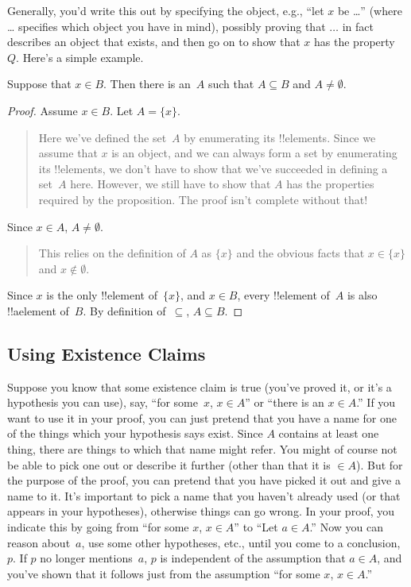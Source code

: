 \documentclass[../../../include/open-logic-section]{subfiles}
\begin{document}
Generally, you'd write this out by specifying the object, e.g., ``let
$x$ be \dots'' (where \dots{} specifies which object you have in
mind), possibly proving that $\dots$ in fact describes an object that
exists, and then go on to show that $x$ has the property~$Q$. Here's a
simple example.

\begin{prop}
  Suppose that $x \in B$. Then there is an~$A$ such that $A \subseteq
  B$ and $A \neq \emptyset$.
\end{prop}

\begin{proof}
  Assume $x \in B$. Let $A = \{x\}$.
  \begin{quote}
    Here we've defined the set~$A$ by enumerating its
    !!{element}s. Since we assume that $x$ is an object, and we can
    always form a set by enumerating its !!{element}s, we don't have
    to show that we've succeeded in defining a set~$A$ here.  However,
    we still have to show that $A$ has the properties required by the
    proposition. The proof isn't complete without that!{}
  \end{quote}
  Since $x \in A$, $A \neq \emptyset$.
  \begin{quote}
    This relies on the definition of $A$ as $\{x\}$ and the obvious
    facts that $x \in \{x\}$ and $x \notin \emptyset$.
  \end{quote}
  Since $x$ is the only !!{element} of~$\{x\}$, and $x \in B$, every
  !!{element} of~$A$ is also !!a{element} of~$B$. By definition
  of~$\subseteq$, $A \subseteq B$.
\end{proof}

\subsection{Using Existence Claims}

Suppose you know that some existence claim is true (you've proved it,
or it's a hypothesis you can use), say, ``for some~$x$, $x \in A$'' or
``there is an $x \in A$.''  If you want to use it in your proof, you
can just pretend that you have a name for one of the things which your
hypothesis says exist. Since $A$ contains at least one thing, there
are things to which that name might refer. You might of course not be
able to pick one out or describe it further (other than that it is
$\in A$). But for the purpose of the proof, you can pretend that you
have picked it out and give a name to it. It's important to pick a
name that you haven't already used (or that appears in your
hypotheses), otherwise things can go wrong. In your proof, you
indicate this by going from ``for some $x$, $x \in A$'' to ``Let $a
\in A$.''  Now you can reason about~$a$, use some other hypotheses, etc.,
until you come to a conclusion, $p$. If $p$ no longer mentions~$a$, $p$ is
independent of the assumption that $a \in A$, and you've shown that it
follows just from the assumption ``for some $x$, $x \in A$.''
\end{document}
